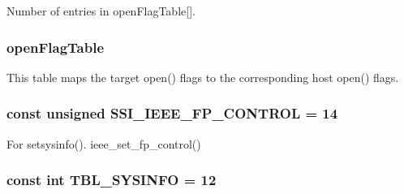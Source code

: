 Number of entries in openFlagTable\mbox{[}\mbox{]}. \hypertarget{classAlphaTru64_ab1db5a531609b99b262cc849ea24765a}{
\subsubsection[{openFlagTable}]{ {\bf openFlagTable}}}
\label{classAlphaTru64_ab1db5a531609b99b262cc849ea24765a}
This table maps the target open() flags to the corresponding host open() flags. \hypertarget{classAlphaTru64_a4dea1885b08c38c78286ecd5ffd5488d}{
\subsubsection[{SSI\_\-IEEE\_\-FP\_\-CONTROL}]{\setlength{\rightskip}{0pt plus 5cm}const unsigned {\bf SSI\_\-IEEE\_\-FP\_\-CONTROL} = 14}}
\label{classAlphaTru64_a4dea1885b08c38c78286ecd5ffd5488d}


For setsysinfo(). ieee\_\-set\_\-fp\_\-control() \hypertarget{classAlphaTru64_a02a979126f2aa34bcdfdc6ab92207d3b}{
\subsubsection[{TBL\_\-SYSINFO}]{\setlength{\rightskip}{0pt plus 5cm}const int {\bf TBL\_\-SYSINFO} = 12}}
\label{classAlphaTru64_a02a979126f2aa34bcdfdc6ab92207d3b}


